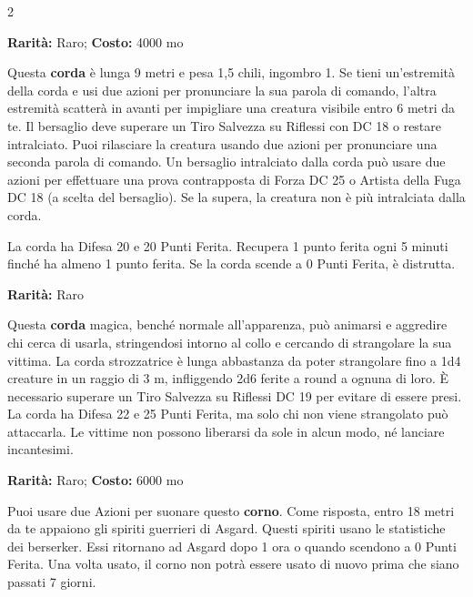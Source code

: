 \begin{multicols}{2}

\textbf{Rarità:} Raro; \textbf{Costo:} 4000 mo

Questa \textbf{corda} è lunga 9 metri e pesa 1,5 chili, ingombro 1. Se tieni un'estremità della corda e usi due azioni per pronunciare la sua parola di comando, l'altra estremità scatterà in avanti per impigliare una creatura visibile entro 6 metri da te. Il bersaglio deve superare un Tiro Salvezza su Riflessi con DC 18 o restare intralciato. Puoi rilasciare la creatura usando due azioni per pronunciare una seconda parola di comando. Un bersaglio intralciato dalla corda può usare due azioni per effettuare una prova contrapposta di Forza DC 25 o Artista della Fuga DC 18 (a scelta del bersaglio). Se la supera, la creatura non è più intralciata dalla corda.

La corda ha Difesa 20 e 20 Punti Ferita. Recupera 1 punto ferita ogni 5 minuti finché ha almeno 1 punto ferita. Se la corda scende a 0 Punti Ferita, è distrutta.


\textbf{Rarità:} Raro

Questa \textbf{corda} magica, benché normale all'apparenza, può animarsi e aggredire chi cerca di usarla, stringendosi intorno al collo e cercando di strangolare la sua vittima. La corda strozzatrice è lunga abbastanza da poter strangolare fino a 1d4 creature in un raggio di 3 m, infliggendo 2d6 ferite a round a ognuna di loro. È necessario superare un Tiro Salvezza su Riflessi DC 19 per evitare di essere presi. La corda ha Difesa 22 e 25 Punti Ferita, ma solo chi non viene strangolato può attaccarla. Le vittime non possono liberarsi da sole in alcun modo, né lanciare incantesimi.


\textbf{Rarità:} Raro; \textbf{Costo:} 6000 mo

Puoi usare due Azioni per suonare questo \textbf{corno}. Come risposta, entro 18 metri da te appaiono gli spiriti guerrieri di Asgard. Questi spiriti usano le statistiche dei berserker. Essi ritornano ad Asgard dopo 1 ora o quando scendono a 0 Punti Ferita. Una volta usato, il corno non potrà essere usato di nuovo prima che siano passati 7 giorni.




\end{multicols}
